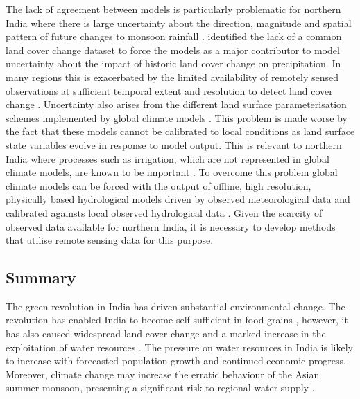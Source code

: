 \documentclass{icldt}\usepackage[]{graphicx}\usepackage[]{color}
\begin{document}
The lack of agreement between models is particularly problematic for northern India where there is large uncertainty about the direction, magnitude and spatial pattern of future changes to monsoon rainfall \citep{Goswami2006,Turner2009}. \citet{Pitman2009} identified the lack of a common land cover change dataset to force the models as a major contributor to model uncertainty about the impact of historic land cover change on precipitation. In many regions this is exacerbated by the limited availability of remotely sensed observations at sufficient temporal extent and resolution to detect land cover change \citep{Goward2006}. Uncertainty also arises from the different land surface parameterisation schemes implemented by global climate models \citep{Pitman2009}. This problem is made worse by the fact that these models cannot be calibrated to local conditions as land surface state variables evolve in response to model output. This is relevant to northern India where processes such as irrigation, which are not represented in global climate models, are known to be important \citep{Boucher2004,Gordon2005}. To overcome this problem global climate models can be forced with the output of offline, high resolution, physically based hydrological models driven by observed meteorological data and calibrated againsts local observed hydrological data \citep{Seneviratne2010}. Given the scarcity of observed data available for northern India, it is necessary to develop methods that utilise remote sensing data for this purpose. \\


\subsection{Summary}
The green revolution in India has driven substantial environmental change. The revolution has enabled India to become self sufficient in food grains \citep{Singh2000}, however, it has also caused widespread land cover change and a marked increase in the exploitation of water resources \citep{Shah2006,Roy2007,Scott2009}. The pressure on water resources in India is likely to increase with forecasted population growth and continued economic progress. Moreover, climate change may increase the erratic behaviour of the Asian summer monsoon, presenting a significant risk to regional water supply \citep{Goswami2006}. \\
\end{document}
